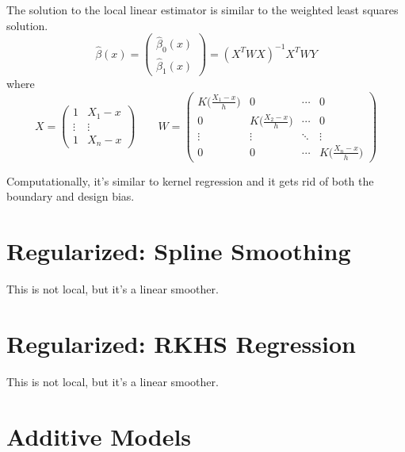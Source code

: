 \documentclass{article}
\begin{document}
  \begin{theorem}
    The solution to the local linear estimator is similar to the weighted least squares solution. 
    \begin{equation}
      \hat{\beta}(x) = \begin{pmatrix} \hat{\beta}_0 (x) \\ \hat{\beta}_1 (x) \end{pmatrix} = (X^T W X)^{-1} X^T W Y
    \end{equation}
    where 
    \begin{equation}
      X = \begin{pmatrix} 1 & X_1 - x \\ \vdots & \vdots \\ 1 & X_n - x \end{pmatrix} \qquad W = \begin{pmatrix} K \bigg( \frac{X_1 - x}{h} \bigg) & 0 & \cdots & 0 \\ 0 & K \bigg( \frac{X_2 - x}{h} \bigg) & \cdots & 0 \\ \vdots & \vdots & \ddots & \vdots \\ 0 & 0 & \cdots & K \bigg( \frac{X_n - x}{h} \bigg) \end{pmatrix}
    \end{equation}
  \end{theorem}

  Computationally, it's similar to kernel regression and it gets rid of both the boundary and design bias. 

\section{Regularized: Spline Smoothing}

  This is not local, but it's a linear smoother. 

\section{Regularized: RKHS Regression}

  This is not local, but it's a linear smoother. 

\section{Additive Models}
\end{document}
